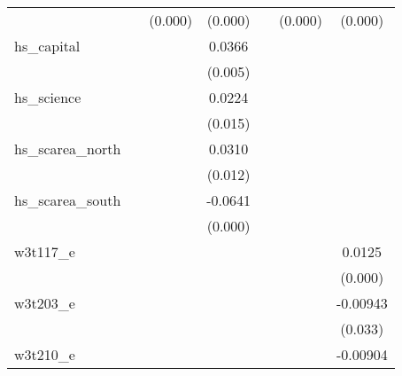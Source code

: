 {\begin{tabular}{l*{6}{c}}
            &                     &     (0.000)         &     (0.000)         &                     &     (0.000)         &     (0.000)         \\
[1em]
hs\_capital  &                     &                     &      0.0366\sym{***}&                     &                     &                     \\
            &                     &                     &     (0.005)         &                     &                     &                     \\
[1em]
hs\_science  &                     &                     &      0.0224\sym{**} &                     &                     &                     \\
            &                     &                     &     (0.015)         &                     &                     &                     \\
[1em]
hs\_scarea\_north&                     &                     &      0.0310\sym{**} &                     &                     &                     \\
            &                     &                     &     (0.012)         &                     &                     &                     \\
[1em]
hs\_scarea\_south&                     &                     &     -0.0641\sym{***}&                     &                     &                     \\
            &                     &                     &     (0.000)         &                     &                     &                     \\
[1em]
w3t117\_e    &                     &                     &                     &                     &                     &      0.0125\sym{***}\\
            &                     &                     &                     &                     &                     &     (0.000)         \\
[1em]
w3t203\_e    &                     &                     &                     &                     &                     &    -0.00943\sym{**} \\
            &                     &                     &                     &                     &                     &     (0.033)         \\
[1em]
w3t210\_e    &                     &                     &                     &                     &                     &    -0.00904\sym{***}\\

\end{tabular}}
